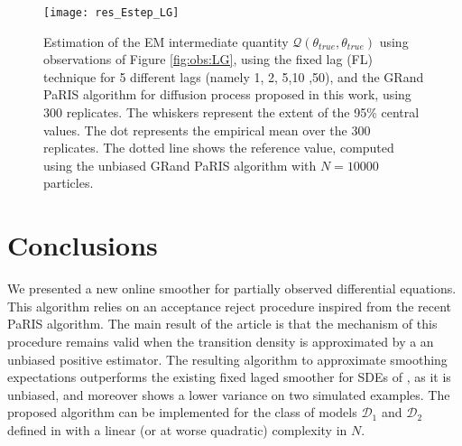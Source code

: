 \documentclass[12pt,draft]{article}
\newcommand{\rmd}{\mathrm{d}}
\newcommand{\eqsp}{\;}
\newcommand{\1}{\mathrm{1}}
\newcommand{\mw}{\mathsf{w}}%
\begin{document}
\begin{figure}[p]
\centering
\texttt{[image: res\_Estep\_LG]}
\caption{Estimation of the EM intermediate quantity $\mathcal{Q}(\theta_{true},\theta_{true})$ using observations of Figure \ref{fig:obs:LG}, using the fixed lag (FL) technique for 5 different lags (namely 1, 2, 5,10 ,50), and the GRand PaRIS algorithm for diffusion process proposed in this work, using 300 replicates. The whiskers represent the extent of the 95\% central values. The dot represents the empirical mean over the 300 replicates. The dotted line shows the reference value, computed using the unbiased GRand PaRIS algorithm with $N=10000$ particles.}
\label{fig:res:LG}
\end{figure}
\section{Conclusions}
We presented a new online smoother for partially observed differential equations. This algorithm relies on an acceptance reject procedure inspired from the recent PaRIS algorithm. The main result of the article is that the mechanism of this procedure remains valid when the transition density is approximated by a an unbiased positive estimator. The resulting algorithm to approximate smoothing expectations outperforms the existing fixed laged smoother for SDEs of \cite{olsson:strojby:2011}, as it is unbiased, and moreover shows a lower variance on two simulated examples. The proposed algorithm can be implemented for the class of models $\mathcal{D}_1$ and $\mathcal{D}_2$ defined in \cite{beskos:papaspiliopoulos:roberts:fearnhead:2006} with a linear (or at worse quadratic) complexity in $N$. 
\end{document}
